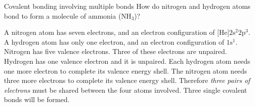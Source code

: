     \noindent
\par 
\begin{wex}{Covalent bonding involving multiple bonds }{
How do nitrogen and hydrogen atoms bond to form a molecule of ammonia ($\text{NH}{}_{3}$)?       
}
{
        \label{m38704*id139225}A nitrogen atom has seven electrons, and an electron configuration of $\text{[He]}2\text{s}^{2}2\text{p}^{3}$. A hydrogen atom has only one electron, and an electron configuration of $1\text{s}^{1}$.
        \label{m38704*id139283}Nitrogen has five valence electrons. Three of these electrons are unpaired. Hydrogen has one valence electron and it is unpaired. 
        \label{m38704*id139292}Each hydrogen atom needs one more electron to complete its valence energy shell. The nitrogen atom needs three more electrons to complete its valence energy shell. Therefore \textsl{three pairs of electrons} must be shared between the four atoms involved. Three single covalent bonds will be formed. 
    \setcounter{subfigure}{0}
\begin{figure}[H]
\end{figure}
 
}
\end{wex}
